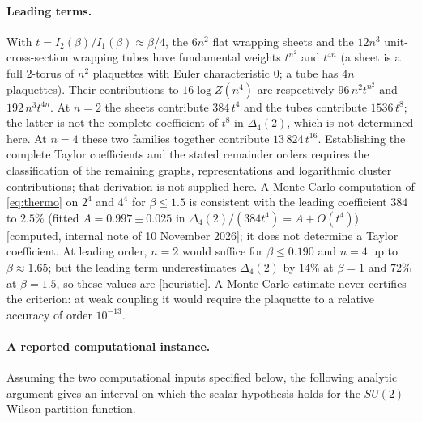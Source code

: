 \documentclass[11pt,a4paper]{article}
\theoremstyle{plain}
\theoremstyle{definition}
\theoremstyle{remark}
\numberwithin{equation}{section}
\newcommand{\st}[1]{\textsf{[#1]}}
\begin{document}
\paragraph{Leading terms.} With $t=I_2(\beta)/I_1(\beta)\approx\beta/4$, the $6n^2$ flat wrapping sheets and the $12n^3$ unit-cross-section wrapping
tubes have fundamental weights $t^{n^2}$ and $t^{4n}$ (a sheet is a full $2$-torus of $n^2$ plaquettes with Euler characteristic $0$; a tube has $4n$ plaquettes). Their
contributions to $16\log Z(n^4)$ are respectively $96\,n^2t^{n^2}$ and $192\,n^3t^{4n}$. At $n=2$ the sheets contribute $384\,t^4$ and the tubes contribute $1536\,t^8$;
the latter is not the complete coefficient of $t^8$ in $\Delta_4(2)$, which is not determined here. At $n=4$ these two families together contribute $13\,824\,t^{16}$.
Establishing the complete Taylor coefficients and the stated remainder orders requires the classification of the remaining graphs, representations and logarithmic
cluster contributions; that derivation is not supplied here. A Monte Carlo computation of \eqref{eq:thermo} on $2^4$ and $4^4$ for $\beta\le1.5$ is consistent with the
leading coefficient $384$ to $2.5\%$ (fitted $A=0.997\pm0.025$ in $\Delta_4(2)/(384t^4)=A+O(t^4)$) \st{computed, internal note of 10 November 2026}; it does not
determine a Taylor coefficient. At leading order, $n=2$ would suffice for $\beta\le0.190$ and $n=4$ up to $\beta\approx1.65$; but the leading term underestimates
$\Delta_4(2)$ by $14\%$ at $\beta=1$ and $72\%$ at $\beta=1.5$, so these values are \st{heuristic}. A Monte Carlo estimate never certifies the criterion: at weak coupling it
would require the plaquette to a relative accuracy of order $10^{-13}$.

\paragraph{A reported computational instance.} Assuming the two computational inputs specified below, the following analytic argument gives an interval on which the scalar hypothesis holds for the $SU(2)$ Wilson partition function.
\end{document}
